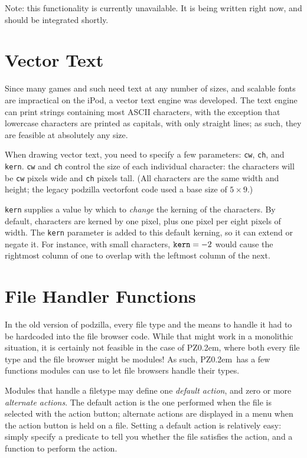 \documentclass[12pt,letterpaper]{report}
\def\pz{{\footnotesize PZ}}
\def\pzt{\pz\kern0.2em{\large\oldstyle2}}
\begin{document}
Note: this functionality is currently unavailable.  It is being written
right now, and should be integrated shortly.


\section{Vector Text}
Since many games and such need text at any number of sizes, and scalable fonts are impractical
on the iPod, a vector text engine was developed. The text engine can print strings containing
most ASCII characters, with the exception that lowercase characters are printed as capitals,
with only straight lines; as such, they are feasible at absolutely any size.

When drawing vector text, you need to specify a few parameters: \verb|cw|, \verb|ch|, and
\verb|kern|. \verb|cw| and \verb|ch| control the size of each individual character:
the characters will be \verb|cw| pixels wide and \verb|ch| pixels tall. (All characters
are the same width and height; the legacy podzilla vectorfont code used a base size of
$5\times9$.)

\verb|kern| supplies a value by which to {\it change} the kerning of the characters.
By default, characters are kerned by one pixel, plus one pixel per eight pixels of width.
The \verb|kern| parameter is added to this default kerning, so it can extend or negate it.
For instance, with small characters, $\verb|kern| = -2$ would cause the rightmost column
of one to overlap with the leftmost column of the next.

\section{File Handler Functions}
In the old version of podzilla, every file type and the means to handle it had to be hardcoded
into the file browser code. While that might work in a monolithic situation, it is certainly
not feasible in the case of \pzt, where both every file type and the file browser might be
modules! As such, \pzt\ has a few functions modules can use to let file browsers handle
their types.

Modules that handle a filetype may define one {\sl default action}, and zero or more {\sl
alternate actions}. The default action is the one performed when the file is selected
with the action button; alternate actions are displayed in a menu when the action button
is held on a file. Setting a default action is relatively easy: simply specify a predicate
to tell you whether the file satisfies the action, and a function to perform the action.
\end{document}
